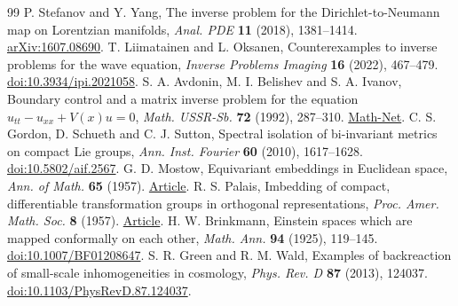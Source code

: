 \documentclass[11pt]{article}
\begin{document}
\begin{thebibliography}{99}
 P. Stefanov and Y. Yang, The inverse problem for the Dirichlet-to-Neumann map on Lorentzian manifolds, \emph{Anal. PDE} \textbf{11} (2018), 1381--1414. \href{https://arxiv.org/abs/1607.08690}{arXiv:1607.08690}.
 T. Liimatainen and L. Oksanen, Counterexamples to inverse problems for the wave equation, \emph{Inverse Problems Imaging} \textbf{16} (2022), 467--479. \href{https://doi.org/10.3934/ipi.2021058}{doi:10.3934/ipi.2021058}.
 S. A. Avdonin, M. I. Belishev and S. A. Ivanov, Boundary control and a matrix inverse problem for the equation \(u_{tt}-u_{xx}+V(x)u=0\), \emph{Math. USSR-Sb.} \textbf{72} (1992), 287--310. \href{https://www.mathnet.ru/eng/sm1296}{Math-Net}.
 C. S. Gordon, D. Schueth and C. J. Sutton, Spectral isolation of bi-invariant metrics on compact Lie groups, \emph{Ann. Inst. Fourier} \textbf{60} (2010), 1617--1628. \href{https://doi.org/10.5802/aif.2567}{doi:10.5802/aif.2567}.
 G. D. Mostow, Equivariant embeddings in Euclidean space, \emph{Ann. of Math.} \textbf{65} (1957). \href{https://webhomes.maths.ed.ac.uk/~v1ranick/papers/mostow.pdf}{Article}.
 R. S. Palais, Imbedding of compact, differentiable transformation groups in orthogonal representations, \emph{Proc. Amer. Math. Soc.} \textbf{8} (1957). \href{https://webhomes.maths.ed.ac.uk/~v1ranick/papers/palais.pdf}{Article}.
 H. W. Brinkmann, Einstein spaces which are mapped conformally on each other, \emph{Math. Ann.} \textbf{94} (1925), 119--145. \href{https://doi.org/10.1007/BF01208647}{doi:10.1007/BF01208647}.
 S. R. Green and R. M. Wald, Examples of backreaction of small-scale inhomogeneities in cosmology, \emph{Phys. Rev. D} \textbf{87} (2013), 124037. \href{https://doi.org/10.1103/PhysRevD.87.124037}{doi:10.1103/PhysRevD.87.124037}.
\end{thebibliography}
\end{document}
